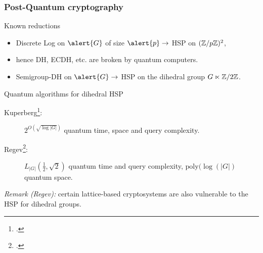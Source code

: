 \documentclass{beamer}
\begin{document}

\begin{frame}
  \frametitle{Post-Quantum cryptography}

  \begin{block}{Known reductions}
    \begin{itemize}
    \item \alert{Discrete Log} on $\alert{G}$ of size $\alert{p} \to$
      \alert{HSP} on \alert{$(\mathbb{Z}/p\mathbb{Z})^2$},
    \item hence DH, ECDH, etc. are broken by quantum computers.
    \item \alert{Semigroup-DH} on $\alert{G} \to$ \alert{HSP} on the
      \alert{dihedral group $G\ltimes\mathbb{Z}/2\mathbb{Z}$}.
    \end{itemize}
  \end{block}

  \begin{block}{Quantum algorithms for dihedral HSP}
    \begin{description}
    \item[Kuperberg\footcite{Kup}:] \alert{$2^{O(\sqrt{\log|G|})}$}
      quantum time, space and query complexity.
    \item[Regev\footcite{regev04}:]
      \alert{$L_{|G|}(\frac{1}{2},\sqrt{2})$} quantum time and query
      complexity, \alert{$\text{poly}(\log(|G|)$} quantum space.
    \end{description}
  \end{block}
  
  \emph{Remark (Regev):} certain lattice-based cryptosystems are also
  vulnerable to the HSP for dihedral groups.
\end{frame}

\end{document}
